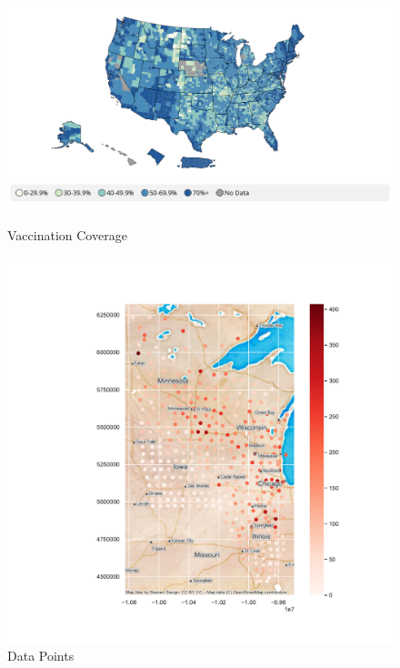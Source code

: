 \documentclass{article}
\begin{document}
\begin{figure}[htbp]
    \centering
    \begin{minipage}{0.7\textwidth}
        \includegraphics[width=\textwidth]{fig/Vaccination Plot.png}
        \caption{Vaccination Coverage}
        \label{Vaccination Coverage}
    \end{minipage}\hfill
    \begin{minipage}{0.3\textwidth}
        \includegraphics[width=\textwidth]{fig/Data Points.pdf}
        \caption{Data Points}
        \label{Final Data Points}
    \end{minipage}
\end{figure}
\end{document}
